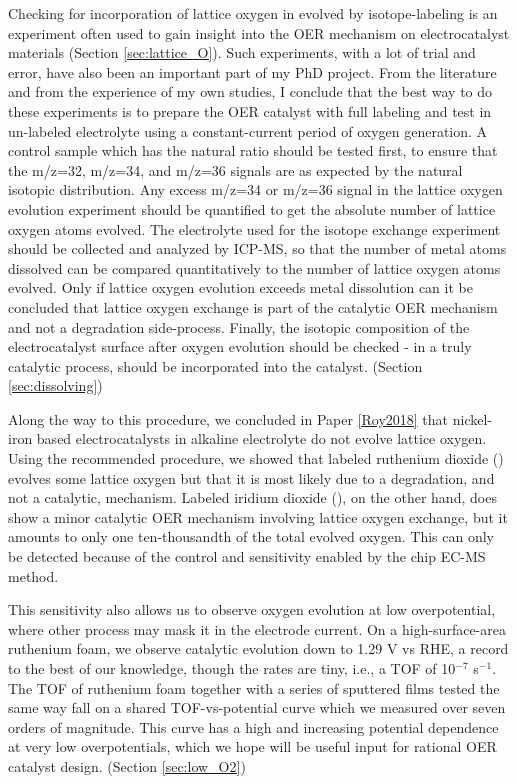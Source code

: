 Checking for incorporation of lattice oxygen in evolved  by isotope-labeling is an experiment often used to gain insight into the OER mechanism on electrocatalyst materials (Section \ref{sec:lattice_O}). Such experiments, with a lot of trial and error, have also been an important part of my PhD project. From the literature and from the experience of my own studies, I conclude that the best way to do these experiments is to prepare the OER catalyst with full  labeling and test in un-labeled electrolyte using a constant-current period of oxygen generation. A control sample which has the natural ratio should be tested first, to ensure that the m/z=32, m/z=34, and m/z=36 signals are as expected by the natural  isotopic distribution. Any excess m/z=34 or m/z=36 signal in the lattice oxygen evolution experiment should be quantified to get the absolute number of lattice oxygen atoms evolved. The electrolyte used for the isotope exchange experiment should be collected and analyzed by ICP-MS, so that the number of metal atoms dissolved can be compared quantitatively to the number of lattice oxygen atoms evolved. Only if lattice oxygen evolution exceeds metal dissolution can it be concluded that lattice oxygen exchange is part of the catalytic OER mechanism and not a degradation side-process. Finally, the isotopic composition of the electrocatalyst surface after oxygen evolution should be checked - in a truly catalytic process,  should be incorporated into the catalyst. (Section \ref{sec:dissolving})

Along the way to this procedure, we concluded in Paper \ref{Roy2018} that nickel-iron based electrocatalysts in alkaline electrolyte do not evolve lattice oxygen. Using the recommended procedure, we showed that labeled ruthenium dioxide () evolves some lattice oxygen but that it is most likely due to a degradation, and not a catalytic, mechanism. Labeled iridium dioxide (), on the other hand, does show a minor catalytic OER mechanism involving lattice oxygen exchange, but it amounts to only one ten-thousandth of the total evolved oxygen. This can only be detected because of the control and sensitivity enabled by the chip EC-MS method.

This sensitivity also allows us to observe oxygen evolution at low overpotential, where other process may mask it in the electrode current. On a high-surface-area ruthenium foam, we observe catalytic  evolution down to 1.29 V vs RHE, a record to the best of our knowledge, though the rates are tiny, i.e., a TOF of 10$^{-7}$ s$^{-1}$. The TOF of ruthenium foam together with a series of sputtered  films tested the same way fall on a shared TOF-vs-potential curve which we measured over seven orders of magnitude. This curve has a high and increasing potential dependence at very low overpotentials, which we hope will be useful input for rational OER catalyst design. (Section \ref{sec:low_O2})

